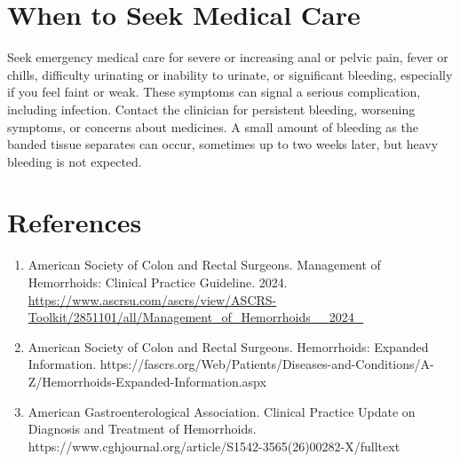 \section*{When to Seek Medical Care}
Seek emergency medical care for severe or increasing anal or pelvic pain, fever or chills, difficulty urinating or inability to urinate, or significant bleeding, especially if you feel faint or weak. These symptoms can signal a serious complication, including infection. Contact the clinician for persistent bleeding, worsening symptoms, or concerns about medicines. A small amount of bleeding as the banded tissue separates can occur, sometimes up to two weeks later, but heavy bleeding is not expected.

\section*{References}
\begin{enumerate}
  \item American Society of Colon and Rectal Surgeons. Management of Hemorrhoids: Clinical Practice Guideline. 2024. \url{https://www.ascrsu.com/ascrs/view/ASCRS-Toolkit/2851101/all/Management_of_Hemorrhoids__2024_}
  \item American Society of Colon and Rectal Surgeons. Hemorrhoids: Expanded Information. https://fascrs.org/Web/Patients/Diseases-and-Conditions/A-Z/Hemorrhoids-Expanded-Information.aspx
  \item American Gastroenterological Association. Clinical Practice Update on Diagnosis and Treatment of Hemorrhoids. https://www.cghjournal.org/article/S1542-3565(26)00282-X/fulltext
\end{enumerate}

\clearpage
